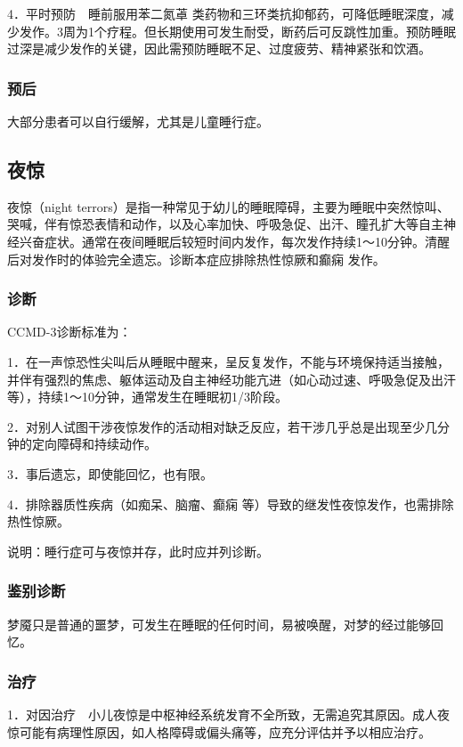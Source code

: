 4．平时预防　睡前服用苯二氮䓬
类药物和三环类抗抑郁药，可降低睡眠深度，减少发作。3周为1个疗程。但长期使用可发生耐受，断药后可反跳性加重。预防睡眠过深是减少发作的关键，因此需预防睡眠不足、过度疲劳、精神紧张和饮酒。

\subsubsection{预后}

大部分患者可以自行缓解，尤其是儿童睡行症。

\subsection{夜惊}

夜惊（night
terrors）是指一种常见于幼儿的睡眠障碍，主要为睡眠中突然惊叫、哭喊，伴有惊恐表情和动作，以及心率加快、呼吸急促、出汗、瞳孔扩大等自主神经兴奋症状。通常在夜间睡眠后较短时间内发作，每次发作持续1～10分钟。清醒后对发作时的体验完全遗忘。诊断本症应排除热性惊厥和癫痫
发作。

\subsubsection{诊断}

CCMD-3诊断标准为：

1．在一声惊恐性尖叫后从睡眠中醒来，呈反复发作，不能与环境保持适当接触，并伴有强烈的焦虑、躯体运动及自主神经功能亢进（如心动过速、呼吸急促及出汗等），持续1～10分钟，通常发生在睡眠初1/3阶段。

2．对别人试图干涉夜惊发作的活动相对缺乏反应，若干涉几乎总是出现至少几分钟的定向障碍和持续动作。

3．事后遗忘，即使能回忆，也有限。

4．排除器质性疾病（如痴呆、脑瘤、癫痫
等）导致的继发性夜惊发作，也需排除热性惊厥。

说明：睡行症可与夜惊并存，此时应并列诊断。

\subsubsection{鉴别诊断}

梦魇只是普通的噩梦，可发生在睡眠的任何时间，易被唤醒，对梦的经过能够回忆。

\subsubsection{治疗}

1．对因治疗　小儿夜惊是中枢神经系统发育不全所致，无需追究其原因。成人夜惊可能有病理性原因，如人格障碍或偏头痛等，应充分评估并予以相应治疗。

